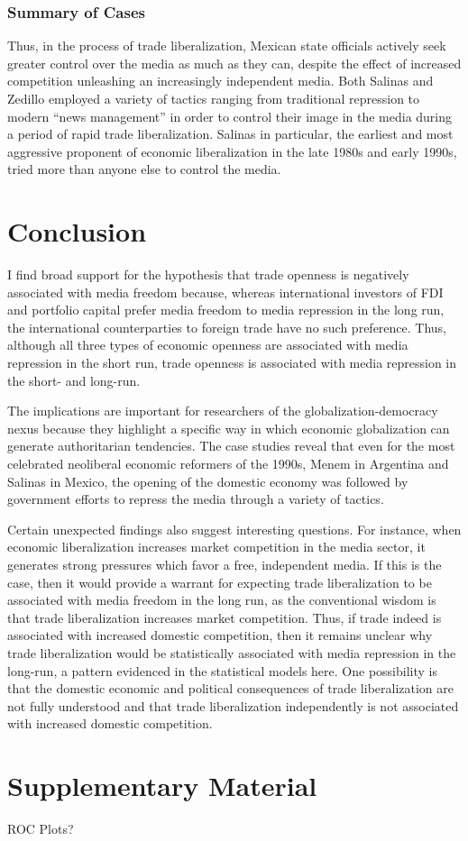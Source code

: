 \documentclass[a4paper]{article}\usepackage[]{graphicx}\usepackage[]{color}
\begin{document}
\subsubsection{Summary of Cases}

Thus, in the process of trade liberalization, Mexican state officials actively seek greater control over the media as much as they can, despite the effect of increased competition unleashing an increasingly independent media. Both Salinas and Zedillo employed a variety of tactics ranging from traditional repression to modern “news management” in order to control their image in the media during a period of rapid trade liberalization. Salinas in particular, the earliest and most aggressive proponent of economic liberalization in the late 1980s and early 1990s, tried more than anyone else to control the media.

\section{Conclusion}

I find broad support for the hypothesis that trade openness is negatively associated with media freedom because, whereas international investors of FDI and portfolio capital prefer media freedom to media repression in the long run, the international counterparties to foreign trade have no such preference. Thus, although all three types of economic openness are associated with media repression in the short run, trade openness is associated with media repression in the short- and long-run.

The implications are important for researchers of the globalization-democracy nexus because they highlight a specific way in which economic globalization can generate authoritarian tendencies. The case studies reveal that even for the most celebrated neoliberal economic reformers of the 1990s, Menem in Argentina and Salinas in Mexico, the opening of the domestic economy was followed by government efforts to repress the media through a variety of tactics. 

Certain unexpected findings also suggest interesting questions. For instance, when economic liberalization increases market competition in the media sector, it generates strong pressures which favor a free, independent media. If this is the case, then it would provide a warrant for expecting trade liberalization to be associated with media freedom in the long run, as the conventional wisdom is that trade liberalization increases market competition. Thus, if trade indeed is associated with increased domestic competition, then it remains unclear why trade liberalization would be statistically associated with media repression in the long-run, a pattern evidenced in the statistical models here. One possibility is that the domestic economic and political consequences of trade liberalization are not fully understood and that trade liberalization independently is not associated with increased domestic competition.

\printbibliography

\section{Supplementary Material}

ROC Plots?
\end{document}
